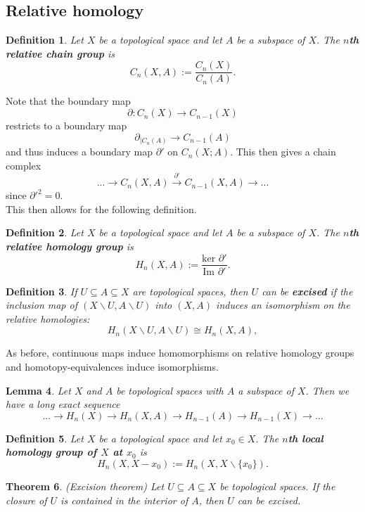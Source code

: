 \documentclass{article}
\newtheorem{theorem}{Theorem}[section]
\newtheorem{definition}[theorem]{Definition}
\newtheorem{lemma}[theorem]{Lemma}
\begin{document}
\subsection{Relative homology}
\begin{definition}
Let $X$ be a topological space and let $A$ be a subspace of $X$. The \textbf{$n$th relative chain group} is \[C_n(X,A):=\frac{C_n(X)}{C_n(A)}.\]
\end{definition}

\noindent Note that the boundary map \[\partial:C_n(X)\to C_{n-1}(X)\] restricts to a boundary map \[\partial_{|C_n(A)}\to C_{n-1}(A)\] and thus induces a boundary map $\partial'$ on $C_n(X;A)$.
This then gives a chain complex \[...\to C_n(X,A)\overset{\partial'}{\to}C_{n-1}(X,A)\to...\] since $\partial'^2=0$.\\

\noindent This then allows for the following definition.

\begin{definition}
Let $X$ be a topological space and let $A$ be a subspace of $X$. The \textbf{$n$th relative homology group} is \[H_n(X,A):=\frac{\text{ker }\partial'}{\text{Im }\partial'}.\]
\end{definition}

\begin{definition}
If $U\subseteq A\subseteq X$ are topological spaces, then $U$ can be \textbf{excised} if the inclusion map of $(X\backslash U,A\backslash U)$ into $(X,A)$ induces an isomorphism on the relative homologies:\[H_n(X\backslash U,A\backslash U)\cong H_n(X,A),\]
\end{definition}

\noindent As before, continuous maps induce homomorphisms on relative homology groups and homotopy-equivalences induce isomorphisms.

\begin{lemma}
Let $X$ and $A$ be topological spaces with $A$ a subspace of $X$. Then we have a long exact sequence \[...\to H_n(X)\to H_n(X,A)\to H_{n-1}(A)\to H_{n-1}(X)\to...\]
\end{lemma}

\begin{definition}
Let $X$ be a topological space and let $x_0\in X$. The \textbf{$n$th local homology group of $X$ at $x_0$} is \[H_n(X,X-x_0):=H_n(X,X\backslash\{x_0\}).\]
\end{definition}

\begin{theorem}
(Excision theorem) Let $U\subseteq A\subseteq X$ be topological spaces. If the closure of $U$ is contained in the interior of $A$, then $U$ can be excised.
\end{theorem}
\end{document}
